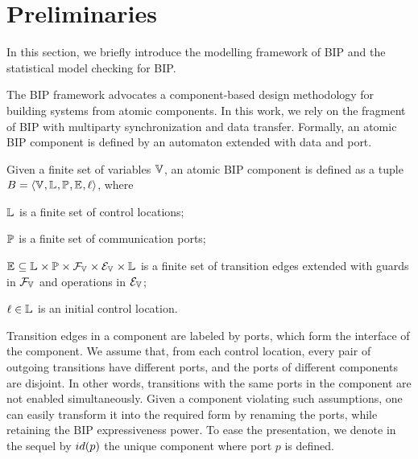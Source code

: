 

\section{Preliminaries}


In this section, we briefly introduce the modelling framework of BIP and the statistical model checking for BIP.

The BIP framework \cite{bip11,atva15,concur16} advocates a component-based design methodology for building systems from atomic components. 
 In this work, we rely on the fragment of BIP with multiparty synchronization and data transfer.
 Formally, an atomic BIP component is defined by an automaton extended with data and port.

\begin{definition} 
	\label{component-def}
	Given a finite set of variables $\mathbb{V}_{}$, 
    an atomic BIP component is defined as a tuple $B_{} = \langle{\ensuremath{\mathbb{V}_{}}, \ensuremath{\mathbb{L}_{}}, \ensuremath{\mathbb{P}_{}}, \ensuremath{\mathbb{E}_{}}, \ell}\rangle$, 
    where
	\begin{inparaenum}
		\item $\mathbb{L}_{}$ is a finite set of control locations;
		\item $\mathbb{P}_{}$ is a finite set of communication ports;
		\item $\mathbb{E}_{} \subseteq \mathbb{L}_{} \times \mathbb{P}_{} \times \mathcal{F}_{\mathbb{V}_{}} \times \mathcal{E}_{\mathbb{V}_{}} \times \mathbb{L}_{}$
		is a finite set of transition edges extended with guards in $\mathcal{F}_{\mathbb{V}_{}}$
		and operations in $\mathcal{E}_{\mathbb{V}_{}}$;
		\item $\ell \in \mathbb{L}_{}$ is an initial control location.
	\end{inparaenum}
\end{definition}

Transition edges in a component are labeled by ports, which form the interface of the component.
We assume that, from each control location, every pair of outgoing transitions have different ports, and the ports of different components are disjoint.
In other words, transitions with the same ports in the component are not enabled simultaneously.
 Given a component violating such assumptions, one can easily transform it into the required form by renaming the ports, while retaining the BIP expressiveness power.
 To ease the presentation, we denote in the sequel by ${id({p})}$ the unique component where port $p$ is defined.


